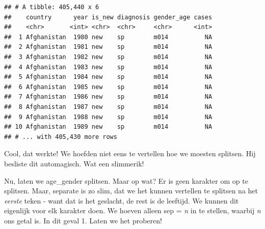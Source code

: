 \documentclass[]{tufte-book}
\newenvironment{Shaded}{}{}
\newcommand{\DataTypeTok}[1]{\textcolor[rgb]{0.56,0.13,0.00}{#1}}
\newcommand{\DecValTok}[1]{\textcolor[rgb]{0.25,0.63,0.44}{#1}}
\newcommand{\KeywordTok}[1]{\textcolor[rgb]{0.00,0.44,0.13}{\textbf{#1}}}
\newcommand{\NormalTok}[1]{#1}
\newcommand{\OperatorTok}[1]{\textcolor[rgb]{0.40,0.40,0.40}{#1}}
\newcommand{\StringTok}[1]{\textcolor[rgb]{0.25,0.44,0.63}{#1}}
\begin{document}
\begin{verbatim}
## # A tibble: 405,440 x 6
##    country      year is_new diagnosis gender_age cases
##    <chr>       <int> <chr>  <chr>     <chr>      <int>
##  1 Afghanistan  1980 new    sp        m014          NA
##  2 Afghanistan  1981 new    sp        m014          NA
##  3 Afghanistan  1982 new    sp        m014          NA
##  4 Afghanistan  1983 new    sp        m014          NA
##  5 Afghanistan  1984 new    sp        m014          NA
##  6 Afghanistan  1985 new    sp        m014          NA
##  7 Afghanistan  1986 new    sp        m014          NA
##  8 Afghanistan  1987 new    sp        m014          NA
##  9 Afghanistan  1988 new    sp        m014          NA
## 10 Afghanistan  1989 new    sp        m014          NA
## # ... with 405,430 more rows
\end{verbatim}

Cool, dat werkte! We hoefden niet eens te vertellen hoe we moesten splitsen. Hij besliste dit automagisch. Wat een slimmerik!

Nu, laten we age\_gender splitsen. Maar op wat? Er is geen karakter om op te splitsen. Maar, separate is zo slim, dat we het kunnen vertellen te splitsen na het \emph{eerste} teken - want dat is het geslacht, de rest is de leeftijd. We kunnen dit eigenlijk voor elk karakter doen. We hoeven alleen sep = \emph{n} in te stellen, waarbij \emph{n} ons getal is. In dit geval 1. Laten we het proberen!

\begin{Shaded}
\end{Shaded}
\end{document}
